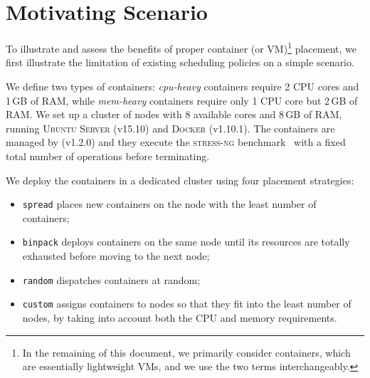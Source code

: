 
\chapter{Motivating Scenario}
\label{chap:motivation}

To illustrate and assess the benefits of proper container (or VM)\footnote{In the remaining of this document, we primarily consider containers, which are essentially lightweight VMs, and we use the two terms interchangeably.} placement, we first illustrate the limitation of existing scheduling policies on a simple scenario.

We define two types of containers: \emph{cpu-heavy} containers require 2 CPU cores and 1\,GB of RAM, while \emph{mem-heavy} containers require only 1 CPU core but 2\,GB of RAM.
We set up a cluster of nodes with 8 available cores and 8\,GB of RAM, running \textsc{Ubuntu Server} (v15.10) and \textsc{Docker} (v1.10.1).
The containers are managed by  (v1.2.0) and they execute the \textsc{stress-ng} benchmark~\cite{stress-ng} with a fixed total number of operations before terminating.

We deploy the containers in a dedicated cluster using four placement strategies:
\begin{itemize}
  \item \texttt{spread} places new containers on the node with the least number of containers;
  \item \texttt{binpack} deploys containers on the same node until its resources are totally exhausted before moving to the next node;
  \item \texttt{random} dispatches containers at random;
  \item \texttt{custom} assigns containers to nodes so that they fit into the least number of nodes, by taking into account both the CPU and memory requirements.
\end{itemize}

